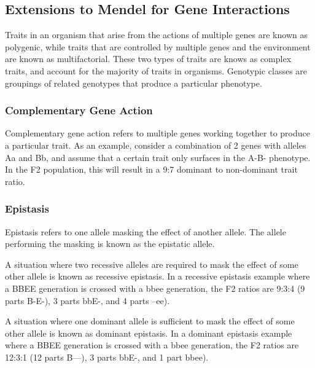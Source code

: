 \documentclass[12pt,titlepage]{article}
\begin{document}
      \subsection{Extensions to Mendel for Gene Interactions}
        Traits in an organism that arise from the actions of multiple genes are known as polygenic, while traits that are controlled by multiple genes and the environment
        are known as multifactorial. These two types of traits are knows as complex traits, and account for the majority of traits in organisms. Genotypic classes are
        groupings of related genotypes that produce a particular phenotype.

        \subsubsection{Complementary Gene Action}
          Complementary gene action refers to multiple genes working together to produce a particular trait. As an example, consider a combination of 2 genes with alleles
          Aa and Bb, and assume that a certain trait only surfaces in the A-B- phenotype. In the F2 population, this will result in a 9:7 dominant to non-dominant trait
          ratio.

        \subsubsection{Epistasis}
          Epistasis refers to one allele masking the effect of another allele. The allele performing the masking is known as the epistatic allele.

          A situation where two recessive alleles are required to mask the effect of some other allele is known as recessive epistasis. In a recessive
          epistasis example where a BBEE generation is crossed with a bbee generation, the F2 ratios are 9:3:4 (9 parts B-E-), 3 parts bbE-, and 4 parts --ee).

          A situation where one dominant allele is sufficient to mask the effect of some other allele is known as dominant epistasis. In a dominant
          epistasis example where a BBEE generation is crossed with a bbee generation, the F2 ratios are 12:3:1 (12 parts B---), 3 parts bbE-, and 1 part bbee).
\end{document}
